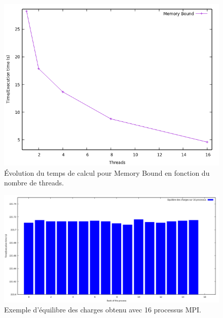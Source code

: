 	\begin{frame}
	\begin{figure}[!ht]	
		\begin{center}\includegraphics[scale=0.5]{Memory.png}\end{center}
		\caption{Évolution du temps de calcul pour Memory Bound en fonction du nombre de threads.}
		\label{fg:fig4}
	\end{figure}	
	\end{frame}
	
	\begin{frame}
	\begin{figure}[!ht]	
		\begin{center}\includegraphics[scale=0.35]{equilibre8.png}\end{center}
		\caption{Exemple d'équilibre des charges obtenu avec 16 processus MPI.}
		\label{fg:fig4}
	\end{figure}	
	\end{frame}
	
